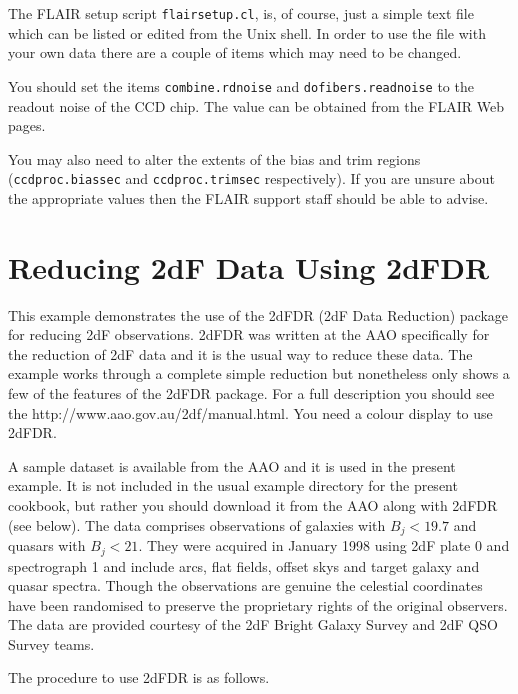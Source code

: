 \documentclass[twoside,11pt]{starlink}
\begin{document}
The FLAIR setup script \texttt{flairsetup.cl}, is, of course, just
a simple text file which can be listed or edited from the Unix
shell.  In order to use the file with your own data there are
a couple of items which may need to be changed.

You should set the items \texttt{combine.rdnoise} and \texttt{dofibers.readnoise} to the readout noise of the CCD chip.  The value
can be obtained from the FLAIR Web pages.

You may also need to alter the extents of the bias and trim
regions (\texttt{ccdproc.biassec} and \texttt{ccdproc.trimsec}
respectively).  If you are unsure about the appropriate values
then the FLAIR support staff should be able to advise.


\newpage
\section{\label{2DF}Reducing 2dF Data Using 2dFDR}

This example demonstrates the use of the 2dFDR (2dF Data Reduction)
package for reducing 2dF observations.  2dFDR was written at the AAO
specifically for the reduction of 2dF data and it is the usual way to
reduce these data.  The example works through a complete simple
reduction but nonetheless only shows a few of the features of the
2dFDR package.  For a full description you should see the
{http://www.aao.gov.au/2df/manual.html}\cite{BAILEY97}.  You need a
colour display to use 2dFDR.

A sample dataset is available from the AAO and it is used in the present
example.  It is not included in the usual example directory for the
present cookbook, but rather you should download it from the AAO along
with 2dFDR (see below).  The data comprises observations of galaxies
with $B_{j} < 19.7$ and quasars with $B_{j} < 21$.  They were acquired
in January 1998 using 2dF plate 0 and spectrograph 1 and include arcs,
flat fields, offset skys and target galaxy and quasar spectra.  Though
the observations are genuine the celestial coordinates have been
randomised to preserve the proprietary rights of the original observers.
The data are provided courtesy of the 2dF Bright Galaxy Survey and
2dF QSO Survey teams.

The procedure to use 2dFDR is as follows.
\end{document}
